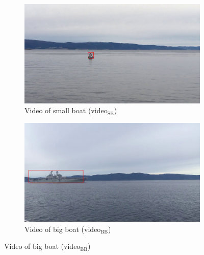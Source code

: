 \begin{figure}[h!]
\centering
\begin{subfigure}[b]{0.78\textwidth}
   \includegraphics[width=1\linewidth]{results/video/video1/frame35.jpg}
   \caption{Video of small boat (video$_{\text{SB}}$)}
   \label{fig:video1} 
\end{subfigure}

\begin{subfigure}[b]{0.78\textwidth}
   \includegraphics[width=1\linewidth]{results/video/video2/frame3.jpg}
   \caption{Video of big boat (video$_{\text{BB}}$)}
   \label{fig:video2}
\end{subfigure}


\end{figure}
